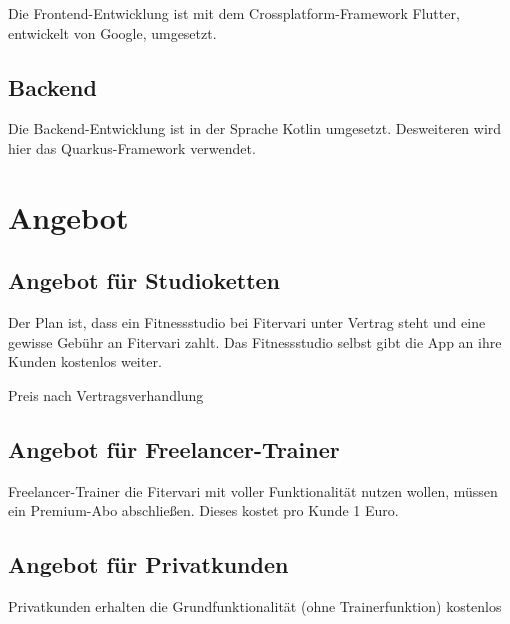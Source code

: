 \documentclass[12pt]{article}
\theoremstyle{definition}
\begin{document}
Die Frontend-Entwicklung ist mit dem Crossplatform-Framework Flutter, entwickelt von Google, umgesetzt.

\subsection{Backend}

Die Backend-Entwicklung ist in der Sprache Kotlin umgesetzt. Desweiteren wird hier das Quarkus-Framework verwendet.


\pagebreak

\section{Angebot}
\subsection{Angebot für Studioketten}

Der Plan ist, dass ein Fitnessstudio bei Fitervari unter Vertrag steht und eine gewisse Gebühr an Fitervari zahlt. Das Fitnessstudio selbst gibt die App an ihre Kunden kostenlos weiter.


Preis nach Vertragsverhandlung

\subsection{Angebot für Freelancer-Trainer}

Freelancer-Trainer die Fitervari mit voller Funktionalität nutzen wollen, müssen ein Premium-Abo abschließen. Dieses kostet pro Kunde 1 Euro.

\subsection{Angebot für Privatkunden}

Privatkunden erhalten die Grundfunktionalität (ohne Trainerfunktion) kostenlos
\end{document}
